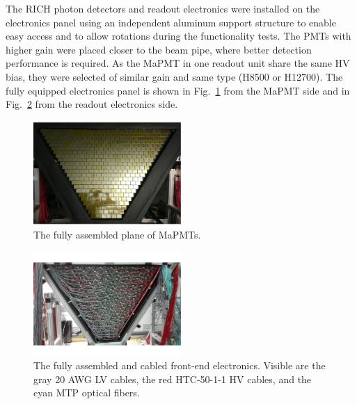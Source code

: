 \documentclass[5p,times,twocolumn]{elsarticle}
\def\MaPMT{MaPMT }
\begin{document}
The RICH photon detectors and readout electronics were installed on the electronics panel using an independent
aluminum support structure to enable easy access and to allow rotations during the functionality tests. The PMTs
with higher gain were placed closer to the beam pipe, where better detection performance is required. As the \MaPMT in
one readout unit share the same HV bias, they were selected of similar gain and same type (H8500 or H12700).
The fully equipped electronics panel is shown in Fig.~\ref{fig:MaPMTs} from the MaPMT side and in
Fig.~\ref{fig:electronics} from the readout electronics side.

\begin{figure}
\begin{center}
\includegraphics[width=0.50\textwidth]{MaPMT.pdf}
\caption{The fully assembled plane of MaPMTs.}
\label{fig:MaPMTs}
\end{center}
\end{figure}

\begin{figure}
\begin{center}
\includegraphics[width=0.50\textwidth]{electronics.pdf}
\caption{The fully assembled and cabled front-end electronics. Visible are the gray 20 AWG LV cables, the red
  HTC-50-1-1 HV cables, and the cyan MTP optical fibers.}
\label{fig:electronics}
\end{center}
\end{figure}
\end{document}
